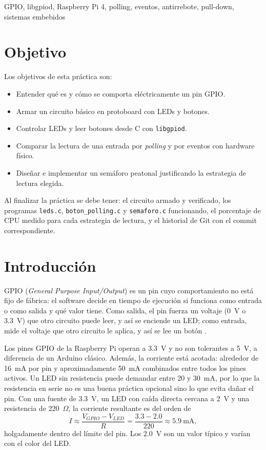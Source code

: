 \documentclass[conference]{IEEEtran}
\begin{document}
\begin{IEEEkeywords}
	GPIO, libgpiod, Raspberry Pi 4, polling, eventos, antirrebote, pull-down, sistemas embebidos
\end{IEEEkeywords}

\section{Objetivo}
Los objetivos de esta práctica son:
\begin{itemize}
	\item Entender qué es y cómo se comporta eléctricamente un pin GPIO.
	\item Armar un circuito básico en protoboard con LEDs y botones.
	\item Controlar LEDs y leer botones desde C con \texttt{libgpiod}.
	\item Comparar la lectura de una entrada por \textit{polling} y por eventos con hardware físico.
	\item Diseñar e implementar un semáforo peatonal justificando la estrategia de lectura elegida.
\end{itemize}

Al finalizar la práctica se debe tener: el circuito armado y verificado, los programas \texttt{leds.c}, \texttt{boton\_polling.c} y \texttt{semaforo.c} funcionando, el porcentaje de CPU medido para cada estrategia de lectura, y el historial de Git con el commit correspondiente.

\section{Introducción}
GPIO (\textit{General Purpose Input/Output}) es un pin cuyo comportamiento no está fijo de fábrica: el software decide en tiempo de ejecución si funciona como entrada o como salida y qué valor tiene. Como salida, el pin fuerza un voltaje (0~V o 3.3~V) que otro circuito puede leer, y así se enciende un LED; como entrada, mide el voltaje que otro circuito le aplica, y así se lee un botón \cite{libgpiod}.

Los pines GPIO de la Raspberry Pi operan a 3.3~V y no son tolerantes a 5~V, a diferencia de un Arduino clásico. Además, la corriente está acotada: alrededor de 16~mA por pin y aproximadamente 50~mA combinados entre todos los pines activos. Un LED sin resistencia puede demandar entre 20 y 30~mA, por lo que la resistencia en serie no es una buena práctica opcional sino lo que evita dañar el pin. Con una fuente de 3.3~V, un LED con caída directa cercana a 2~V y una resistencia de 220~$\Omega$, la corriente resultante es del orden de
\begin{equation}
	I \approx \frac{V_{GPIO} - V_{LED}}{R} = \frac{3.3 - 2.0}{220} \approx 5.9~\text{mA},
\end{equation}
holgadamente dentro del límite del pin. Los $2.0$~V son un valor típico y varían con el color del LED.
\end{document}
